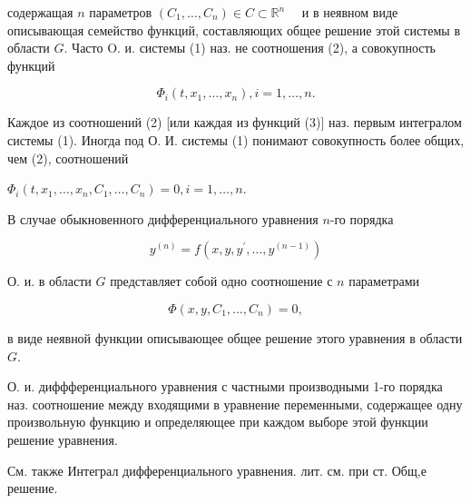 \documentclass[10pt]{article}
\begin{document}
содержащая $n$ параметров $\left(C_{1}, \ldots, C_{n}\right) \in C \subset \mathbb{R}^{n} \quad$ и в неявном виде описывающая семейство функций, составляющих общее решение этой системы в области $G$. Часто O. и. системы (1) наз. не соотношения (2), а совокупность функций



\[

\Phi_{i}\left(t, x_{1}, \ldots, x_{n}\right), i=1, \ldots, n .

\]



Каждое из соотношений (2) [или каждая из функций (3)] наз. первым интегралом системы (1). Иногда под О. И. системы (1) понимают совокупность более общих, чем (2), соотношений



$\Phi_{i}\left(t, x_{1}, \ldots, x_{n}, C_{1}, \ldots, C_{n}\right)=0, i=1, \ldots, n$.



В случае обыкновенного дифференциального уравнения $n$-го порядка



\[

y^{(n)}=f\left(x, y, y^{\prime}, \ldots, y^{(n-1)}\right)

\]



О. и. в области $G$ представляет собой одно соотношение с $n$ параметрами



\[

\Phi\left(x, y, C_{1}, \ldots, C_{n}\right)=0,

\]



в виде неявной функции описывающее общее решение этого уравнения в области $G$.



О. и. диффференциального уравнения с частными производными 1-го порядка наз. соотношение между входящими в уравнение переменными, содержащее одну произвольную функцию и определяющее при каждом выборе этой функции решение уравнения.



См. также Интеграл дифференциального уравнения. лит. см. при ст. Общ,е решение.
\end{document}
